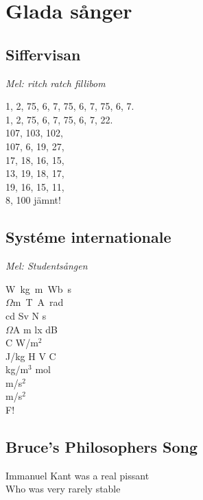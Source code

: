 \documentclass[twoside, openright]{report}
\begin{document}
\chapter{Glada sånger}

\section{Siffervisan}
\textit{Mel: ritch ratch fillibom}
\begin{center}
1, 2, 75, 6, 7, 75, 6, 7, 75, 6, 7.\\
1, 2, 75, 6, 7, 75, 6, 7, 22.\\
107, 103, 102,\\
107, 6, 19, 27,\\
17, 18, 16, 15,\\
13, 19, 18, 17,\\
19, 16, 15, 11,\\
8, 100 jämnt!
\end{center}

\section{Systéme internationale}
\textit{Mel: Studentsången}
\begin{center}
W\ kg\ m\ Wb\ s\\
$\Omega$m\ T\ A\ rad\\
cd Sv N s\\
$\Omega$A m lx dB\\
\degree C W/m$^2$\\
J/kg H V C\\
kg/m$^3$ mol\\
m/s$^2$\\
m/s$^2$\\
F!
\end{center}

\section{Bruce's Philosophers Song}

Immanuel Kant was a real pissant\\
Who was very rarely stable\\
\end{document}
